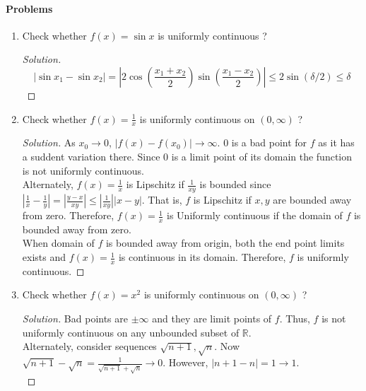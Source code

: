 \paragraph{Problems}
\begin{enumerate}
	\item Check whether $f(x) = \sin x$ is uniformly continuous ?
	\begin{proof}[Solution]
		$$ |\sin x_1 - \sin x_2| = \left|2\cos\left(\frac{x_1+x_2}{2}\right)\sin\left(\frac{x_1-x_2}{2}\right)\right| \le 2\sin(\delta/2) \le \delta $$
	\end{proof}
	\item Check whether $f(x) = \frac{1}{x}$ is uniformly continuous on $(0,\infty)$ ?
	\begin{proof}[Solution]
		As $x_0 \to 0$, $|f(x)-f(x_0)| \to \infty$.
		$0$ is a bad point for $f$ as it has a suddent variation there. Since $0$ is a limit point of its domain the function is not uniformly continuous.\\

		Alternately, $f(x) = \frac{1}{x}$ is Lipschitz if $\frac{1}{xy}$ is bounded since $|\frac{1}{x}-\frac{1}{y}| = | \frac{y-x}{xy} | \le |\frac{1}{xy}| |x-y|$. That is, $f$ is Lipschitz if $x,y$ are bounded away from zero. Therefore, $f(x) = \frac{1}{x}$ is Uniformly continuous if the domain of $f$ is bounded away from zero.\\

		When domain of $f$ is bounded away from origin, both the end point limits exists and $f(x)=\frac{1}{x}$ is continuous in its domain. Therefore, $f$ is uniformly continuous.

	\end{proof}
	\item Check whether $f(x) = x^2$ is uniformly continuous on $(0,\infty)$ ?
	\begin{proof}[Solution]
		Bad points are $\pm \infty$ and they are limit points of $f$. Thus, $f$ is not uniformly continuous on any unbounded subset of $\mathbb{R}$.\\

		Alternately, consider sequences $\sqrt{n+1}, \sqrt{n}$. Now $\sqrt{n+1} - \sqrt{n} = \frac{1}{\sqrt{n+1}+\sqrt{n}} \to 0$. However, $|n+1-n| = 1 \to 1$.\\


\end{proof}
\end{enumerate}
